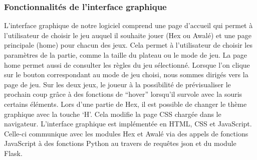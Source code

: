 \subsubsection{Fonctionnalités de l'interface graphique}
L'interface graphique de notre logiciel comprend une page d'accueil qui permet à l'utilisateur
de choisir le jeu auquel il souhaite jouer (Hex ou Awalé) et une page principale (home) pour chacun des jeux.
Cela permet à l'utilisateur de choisir les paramètres de la partie, comme la taille du plateau ou le 
mode de jeu. La page home permet aussi de consulter les règles du jeu sélectionné.
Lorsque l'on clique sur le bouton correspondant au mode de jeu choisi, nous sommes dirigés vers la page de
jeu.
Sur les deux jeux, le joueur à la possibilité de prévisualiser le prochain coup grâce à des fonctions de ``hover'' lorsqu'il survole avec 
la souris certains éléments.
Lors d'une partie de Hex, il est possible de changer le thème graphique avec la touche `H'. Cela modifie la page CSS chargée dans le navigateur.
L'interface graphique est implémentée en HTML, CSS et JavaScript. Celle-ci communique avec les modules Hex et Awalé via des appels de fonctions JavaScript à des
fonctions Python au travers de requêtes json et du module Flask.

